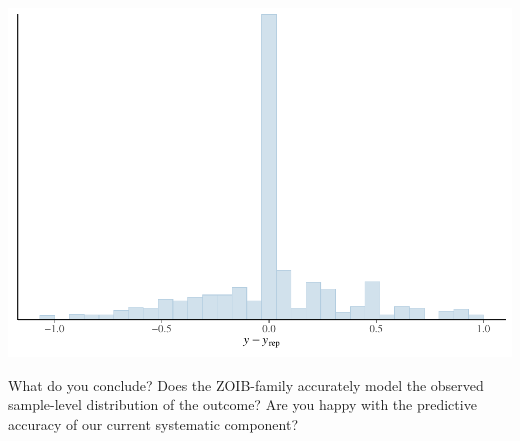 \documentclass[
  11pt,
]{article}
\begin{document}
\begin{center}\includegraphics{02-02-lec_files/figure-latex/brms-zoib-pp-2-1} \end{center}

What do you conclude? Does the ZOIB-family accurately model the observed
sample-level distribution of the outcome? Are you happy with the predictive
accuracy of our current systematic component?
\end{document}
